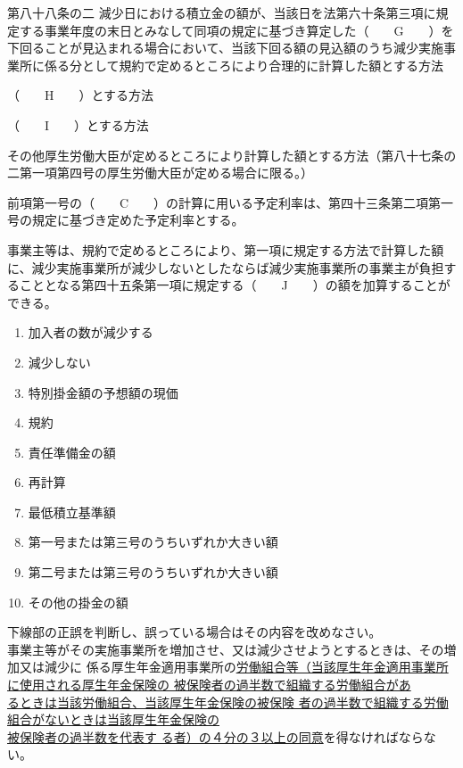\begin{fillblank}[数理人試験 2020 問題1 設問2　\&　年金2 H28 問題1(3)C〜I]
\begin{lawstructure}
\begin{lawarticle}{第八十八条の二}{}
      減少日における積立金の額が、当該日を法第六十条第三項に規定する事業年度の末日とみなして同項の規定に基づき算定した（　　G　　）を下回ることが見込まれる場合において、当該下回る額の見込額のうち減少実施事業所に係る分として規約で定めるところにより合理的に計算した額とする方法

      （　　H　　）とする方法

      （　　I　　）とする方法

      その他厚生労働大臣が定めるところにより計算した額とする方法（第八十七条の二第一項第四号の厚生労働大臣が定める場合に限る。）

      前項第一号の（　　C　　）の計算に用いる予定利率は、第四十三条第二項第一号の規定に基づき定めた予定利率とする。

      事業主等は、規約で定めるところにより、第一項に規定する方法で計算した額に、減少実施事業所が減少しないとしたならば減少実施事業所の事業主が負担することとなる第四十五条第一項に規定する（　　J　　）の額を加算することができる。
    \end{lawarticle}
  \end{lawstructure}
\end{fillblank}


\begin{answerbox}
  \begin{enumerate}[A: ]
    \item 加入者の数が減少する
    \item 減少しない
    \item 特別掛金額の予想額の現価
    \item 規約
    \item 責任準備金の額
    \item 再計算
    \item 最低積立基準額
    \item 第一号または第三号のうちいずれか大きい額
    \item 第二号または第三号のうちいずれか大きい額
    \item その他の掛金の額
  \end{enumerate}
\end{answerbox}

\begin{truefalse}[年金1 2025 問題1(3)ア]
  下線部の正誤を判断し、誤っている場合はその内容を改めなさい。
  \\

  事業主等がその実施事業所を増加させ、又は減少させようとするときは、その増加又は減少に
係る厚生年金適用事業所の\underline{労働組合等（当該厚生年金適用事業所に使用される厚生年金保険の
被保険者の過半数で組織する労働組合があ}\\
\underline{るときは当該労働組合、当該厚生年金保険の被保険
者の過半数で組織する労働組合がないときは当該厚生年金保険の}\\
\underline{被保険者の過半数を代表す
る者）の４分の３以上の同意}を得なければならない。
\end{truefalse}

